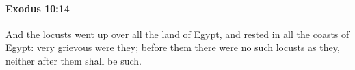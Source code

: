 
		\paragraph{Exodus 10:14} %
			\label{EXODUS-10-14}

			And the locusts went up over all the land of Egypt, and rested in all the coasts of Egypt: very grievous were they; before them there were no such locusts as they, neither after them shall be such.



